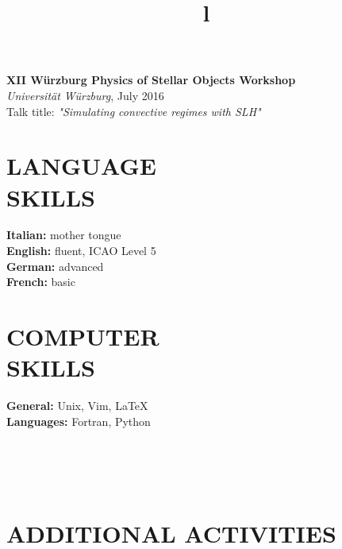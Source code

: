 \documentclass[margin]{res}
\begin{document}
\begin{resume}
\textbf{XII Würzburg Physics of Stellar Objects Workshop}\\
{\sl Universität Würzburg}, July 2016\\
Talk title: \textit{"Simulating convective regimes with SLH"}  

\section{LANGUAGE\\SKILLS}

\textbf{Italian: } mother tongue
\\
\textbf{English: } fluent, ICAO Level 5
\\
\textbf{German: } advanced
\\
\textbf{French: } basic

\section{COMPUTER\\SKILLS}

\textbf{General: } Unix, Vim, \LaTeX
\\
\textbf{Languages: } Fortran, Python

\begin{format}
\title{l}\\
\\
\body\\
\end{format}

\section{ADDITIONAL ACTIVITIES}




\end{resume}
\(\)
\end{document}
